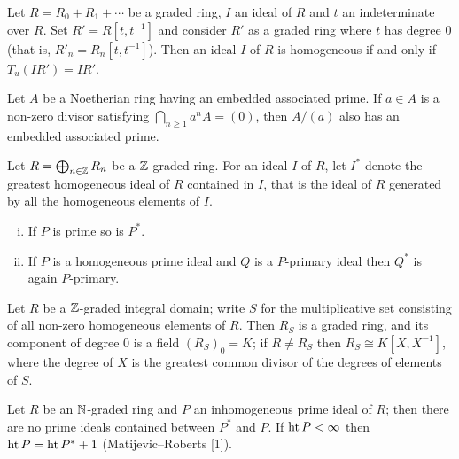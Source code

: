 \begin{exercise}\label{ex:13.2-ex}
Let $R = R_0 + R_1 + \cdots$ be a graded ring, $I$ an ideal of $R$ and $t$ an
indeterminate over $R$. Set $R' = R[t, t^{-1}]$ and consider $R'$ as a graded ring
where $t$ has degree $0$ (that is, $R'_n = R_n[t, t^{-1}]$). Then an ideal $I$ of $R$ is
homogeneous if and only if $T_u(IR') = IR'$.
\end{exercise}

\begin{exercise}\label{ex:13.3-ex}
Let $A$ be a Noetherian ring having an embedded associated prime. If $a \in A$
is a non-zero divisor satisfying $\bigcap_{n \ge 1} a^nA = (0)$, then $A/(a)$ also has an
embedded associated prime.
\end{exercise}

\begin{exercise}\label{ex:13.4-ex}
Let $R = \bigoplus_{n \in \mathbb{Z}} R_n$ be a $\mathbb{Z}$-graded ring. For an ideal $I$ of $R$, let $I^*$ denote the
greatest homogeneous ideal of $R$ contained in $I$, that is the ideal of $R$
generated by all the homogeneous elements of $I$.
\begin{enumerate}[(i)]
  \item If $P$ is prime so is $P^*$.
  \item If $P$ is a homogeneous prime ideal and $Q$ is a $P$-primary ideal then $Q^*$
        is again $P$-primary.
\end{enumerate}
\end{exercise}

\begin{exercise}\label{ex:13.5-ex}
Let $R$ be a $\mathbb{Z}$-graded integral domain; write $S$ for the multiplicative set
consisting of all non-zero homogeneous elements of $R$. Then $R_S$ is a graded
ring, and its component of degree $0$ is a field $(R_S)_0 = K$; if $R \neq R_S$ then $R_S
\cong K[X, X^{-1}]$, where the degree of $X$ is the greatest common divisor of the
degrees of elements of $S$.
\end{exercise}

\begin{exercise}\label{ex:13.6-ex}
Let $R$ be an $\mathbb{N}$-graded ring and $P$ an inhomogeneous prime ideal of $R$; then
there are no prime ideals contained between $P^*$ and $P$. If $\operatorname{ht} P < \infty$ then
$\operatorname{ht} P = \operatorname{ht} P^* + 1$ (Matijevic--Roberts [1]).
\end{exercise}
